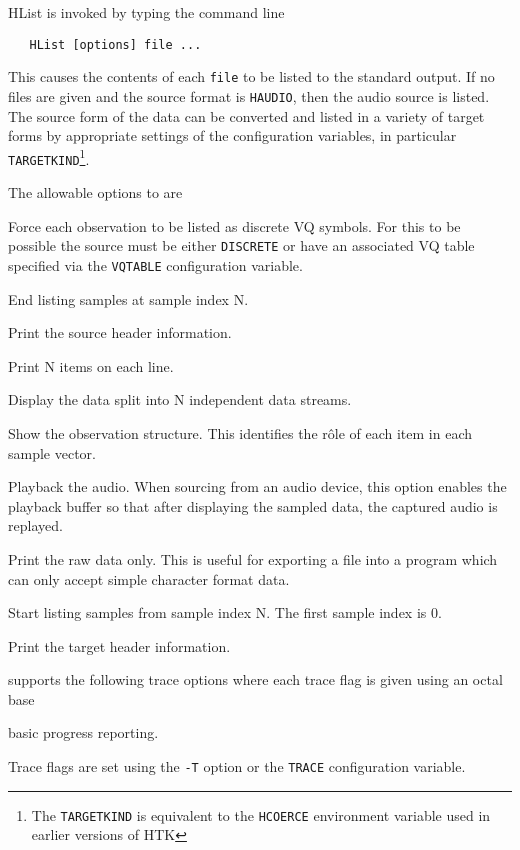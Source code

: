 HList is invoked by typing the command line
\begin{verbatim}
   HList [options] file ...
\end{verbatim}
This causes the contents of each {\tt file} to be listed to the
standard output.  If no files are given and the source format
is \texttt{HAUDIO}, then the audio source is listed.  The source
form of the data can be converted and listed in a variety of target forms by
appropriate settings of the configuration variables, in particular
\texttt{TARGETKIND}\footnote{The \texttt{TARGETKIND} is equivalent to
the \texttt{HCOERCE} environment variable used in earlier versions
of HTK}.

The allowable options to  are

\begin{optlist}

   Force each observation to be listed as discrete VQ symbols.
    For this to be possible the source must be either \texttt{DISCRETE}
    or have an associated VQ table specified via the \texttt{VQTABLE}
    configuration variable.

    End listing samples at sample index N. 

    Print the source header information.

    Print N items on each line.

    Display the data split into N independent data streams.

    Show the observation structure.  This identifies the r\^{o}le
      of each item in each sample vector.

    Playback the audio.  When sourcing from an audio device,
     this option enables the playback buffer so that after displaying the
     sampled data, the captured audio is replayed.

    Print the raw data only.  This is useful for exporting a file
     into a program which can only accept simple character format data.

    Start listing samples from sample index N.  The first sample
index is 0.
 
    Print the target header information.

\stdoptF

\end{optlist}


 supports the following trace options where each
trace flag is given using an octal base
\begin{optlist}
    basic progress reporting.
\end{optlist}
Trace flags are set using the \texttt{-T} option or the  \texttt{TRACE} 
configuration variable.


